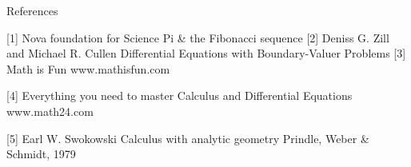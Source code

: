 \documentclass[newPxFont]{beamer}
\begin{document}
\begin{frame}{References}
	\begin{thebibliography}{10}
	\beamertemplatebookbibitems
  [1] Nova foundation for Science
  \newblock Pi \& the Fibonacci sequence
  [2] Deniss G. Zill and Michael R. Cullen
	\newblock Differential Equations with Boundary-Valuer Problems
    [3] Math is Fun
	\newblock www.mathisfun.com

    [4] Everything you need to master Calculus and Differential Equations
	\newblock www.math24.com

	\beamertemplatebookbibitems
	[5] Earl W. Swokowski
	\newblock Calculus with analytic geometry
	\newblock Prindle, Weber \& Schmidt, 1979

  \end{thebibliography}
\end{frame}
\end{document}
